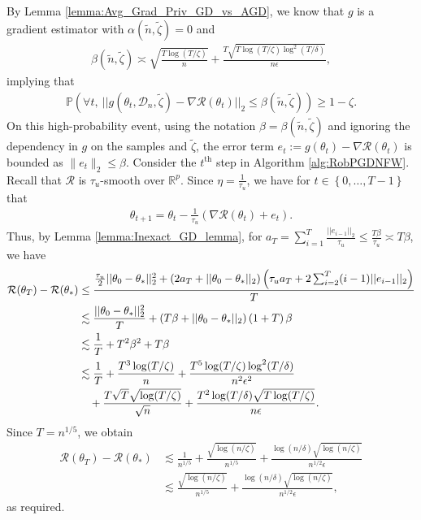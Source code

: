\documentclass{article}
\begin{document}
By Lemma \ref{lemma:Avg_Grad_Priv_GD_vs_AGD}, we know that $g$ is a gradient estimator with $\alpha(\widetilde{n}, \widetilde{\zeta}) = 0$ and
\begin{align*}
\beta(\widetilde{n}, \widetilde{\zeta}) \asymp \sqrt{\frac{T\log(T/\zeta)}{n}} + \frac{T\sqrt{T\log(T/\zeta)\log^2(T/\delta)}}{n\epsilon},
\end{align*}
implying that
\begin{align*}
 \mathbb{P}(\forall t, \ ||g(\theta_t, \mathcal{D}_n, \widetilde{\zeta}) - \nabla\mathcal{R}(\theta_t)||_2 \leq \beta(\widetilde{n}, \widetilde{\zeta})) \geq 1 - \zeta.
\end{align*}
On this high-probability event, using the notation $\beta = \beta(\widetilde{n}, \widetilde{\zeta})$ and ignoring the dependency in $g$ on the samples and $\widetilde{\zeta}$, the error term $e_t := g(\theta_t) - \nabla\mathcal{R}(\theta_t)$ is bounded as $\|e_t\|_2 \le \beta$. Consider the $t^{\text{th}}$ step in Algorithm \ref{alg:RobPGDNFW}. Recall that $\mathcal{R}$ is $\tau_u$-smooth over $\mathbb{R}^p$. Since $\eta = \frac{1}{\tau_u}$, we have for $t \in \left\{0, \dots, T - 1\right\}$ that 
\begin{align*}
\theta_{t + 1} = \theta_t - \frac{1}{\tau_u}(\nabla \mathcal{R}(\theta_t) + e_t).
\end{align*}
Thus, by Lemma \ref{lemma:Inexact_GD_lemma}, for $a_T = \sum_{i = 1}^T\frac{||e_{i - 1}||_2}{\tau_u} \leq \frac{T\beta}{\tau_u} \asymp T\beta$, we have 
\begin{align}
\label{eq:Smooth_GD_Best_T}
\mathcal{R}(\theta_T) - \mathcal{R}(\theta_*) &\leq \frac{\frac{\tau_u}{2}||\theta_0 - \theta_*||_2^2 + (2a_T + ||\theta_0 - \theta_*||_2)\left(\tau_ua_T + 2\sum_{i = 2}^T(i - 1)||e_{i - 1}||_2\right)}{T} \notag\\
&\lesssim \frac{||\theta_0 - \theta_*||_2^2}{T} + (T\beta + ||\theta_0 - \theta_*||_2)\left(1 + T\right)\beta \notag\\
&\lesssim \frac{1}{T} + T^2\beta^2 + T\beta \notag\\
&\lesssim \frac{1}{T} + \frac{T^3\log(T/\zeta)}{n} + \frac{T^5\log(T/\zeta)\log^2(T/\delta)}{n^2\epsilon^2} \notag\\
& \quad + \frac{T\sqrt{T}\sqrt{\log(T/\zeta)}}{\sqrt{n}} + \frac{T^2\log(T/\delta)\sqrt{T\log(T/\zeta)}}{n\epsilon}.
\end{align} 
Since $T = n^{1/5}$, we obtain
\begin{align*}
\mathcal{R}(\theta_T) - \mathcal{R}(\theta_*) &\lesssim \frac{1}{n^{1/5}} + \frac{\sqrt{\log(n/\zeta)}}{n^{1/5}} + \frac{\log(n/\delta)\sqrt{\log(n/\zeta)}}{n^{1/2}\epsilon}\\
&\lesssim \frac{\sqrt{\log(n/\zeta)}}{n^{1/5}} + \frac{\log(n/\delta)\sqrt{\log(n/\zeta)}}{n^{1/2}\epsilon},
\end{align*}
as required.
\end{document}
